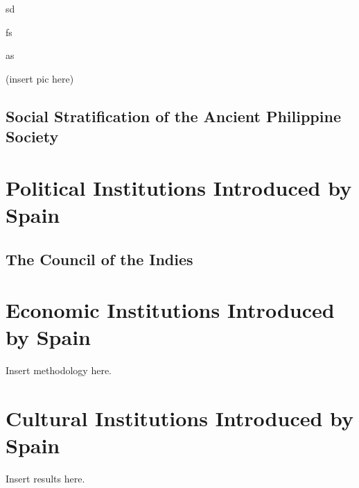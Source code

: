 \documentclass[12pt]{article}
\begin{document}
  sd

  fs

  as

  (insert pic here)


  \subsection{Social Stratification of the Ancient Philippine Society}








\section{Political Institutions Introduced by Spain}
  \subsection{The Council of the Indies}
  






\section{Economic Institutions Introduced by Spain}
Insert methodology here.





\section{Cultural Institutions Introduced by Spain}
Insert results here.








\end{document}

